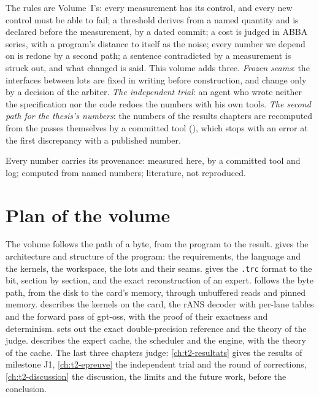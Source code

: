 The rules are Volume~I's: every measurement has its control, and every new control must be able to fail; a threshold derives from a named quantity and is declared before the measurement, by a dated commit; a cost is judged in ABBA series, with a program's distance to itself as the noise; every number we depend on is redone by a second path; a sentence contradicted by a measurement is struck out, and what changed is said. This volume adds three. \emph{Frozen seams}: the interfaces between lots are fixed in writing before construction, and change only by a decision of the arbiter. \emph{The independent trial}: an agent who wrote neither the specification nor the code redoes the numbers with his own tools. \emph{The second path for the thesis's numbers}: the numbers of the results chapters are recomputed from the passes themselves by a committed tool (), which stops with an error at the first discrepancy with a published number.

Every number carries its provenance: \mes{} measured here, by a committed tool and log; \calc{} computed from named numbers; \litt{} literature, not reproduced.

\section{Plan of the volume}\label{t2i-sec:plan}

The volume follows the path of a byte, from the program to the result.  gives the architecture and structure of the program: the requirements, the language and the kernels, the workspace, the lots and their seams.  gives the \texttt{.trc} format to the bit, section by section, and the exact reconstruction of an expert.  follows the byte path, from the disk to the card's memory, through unbuffered reads and pinned memory.  describes the kernels on the card, the rANS decoder with per-lane tables and the forward pass of gpt-oss, with the proof of their exactness and determinism.  sets out the exact double-precision reference and the theory of the judge.  describes the expert cache, the scheduler and the engine, with the theory of the cache. The last three chapters judge: \cref{ch:t2-resultats} gives the results of milestone J1, \cref{ch:t2-epreuve} the independent trial and the round of corrections, \cref{ch:t2-discussion} the discussion, the limits and the future work, before the conclusion.
